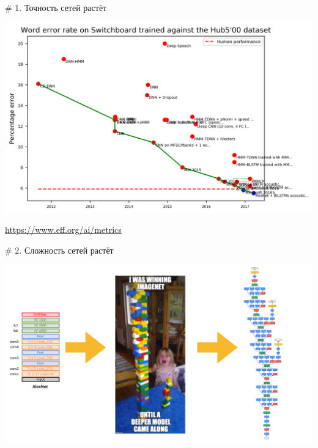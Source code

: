 \documentclass[notes,12pt, aspectratio=169]{beamer}
\begin{document}
\begin{frame}{\# 1. Точность сетей растёт}
\begin{center}
	\includegraphics[width=.7\linewidth]{speech_recognition.png}
\end{center}
\vfill %
\footnotesize
\color{blue} \url{https://www.eff.org/ai/metrics}
\end{frame}


\begin{frame}{\# 2. Сложность сетей растёт}
\begin{center}
	\includegraphics[width=.9\linewidth]{trend2.png}
\end{center}
\end{frame}
\end{document}
